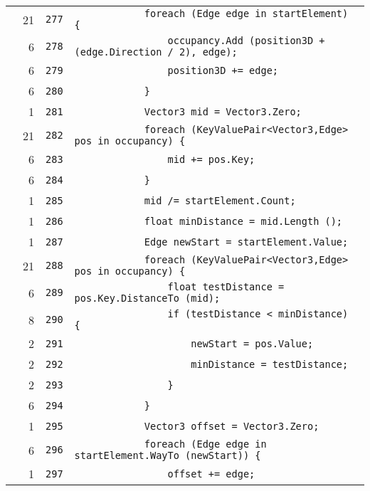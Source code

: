 \documentclass[a4paper,10pt]{article}
\begin{document}
\begin{longtable}[l]{lrrl}
\cellcolor{green} & 21 & \verb~277~ & \verb~            foreach (Edge edge in startElement) {~\\
\cellcolor{green} & 6 & \verb~278~ & \verb~                occupancy.Add (position3D + (edge.Direction / 2), edge);~\\
\cellcolor{green} & 6 & \verb~279~ & \verb~                position3D += edge;~\\
\cellcolor{green} & 6 & \verb~280~ & \verb~            }~\\
\cellcolor{green} & 1 & \verb~281~ & \verb~            Vector3 mid = Vector3.Zero;~\\
\cellcolor{green} & 21 & \verb~282~ & \verb~            foreach (KeyValuePair<Vector3,Edge> pos in occupancy) {~\\
\cellcolor{green} & 6 & \verb~283~ & \verb~                mid += pos.Key;~\\
\cellcolor{green} & 6 & \verb~284~ & \verb~            }~\\
\cellcolor{green} & 1 & \verb~285~ & \verb~            mid /= startElement.Count;~\\
\cellcolor{green} & 1 & \verb~286~ & \verb~            float minDistance = mid.Length ();~\\
\cellcolor{green} & 1 & \verb~287~ & \verb~            Edge newStart = startElement.Value;~\\
\cellcolor{green} & 21 & \verb~288~ & \verb~            foreach (KeyValuePair<Vector3,Edge> pos in occupancy) {~\\
\cellcolor{green} & 6 & \verb~289~ & \verb~                float testDistance = pos.Key.DistanceTo (mid);~\\
\cellcolor{green} & 8 & \verb~290~ & \verb~                if (testDistance < minDistance) {~\\
\cellcolor{green} & 2 & \verb~291~ & \verb~                    newStart = pos.Value;~\\
\cellcolor{green} & 2 & \verb~292~ & \verb~                    minDistance = testDistance;~\\
\cellcolor{green} & 2 & \verb~293~ & \verb~                }~\\
\cellcolor{green} & 6 & \verb~294~ & \verb~            }~\\
\cellcolor{green} & 1 & \verb~295~ & \verb~            Vector3 offset = Vector3.Zero;~\\
\cellcolor{green} & 6 & \verb~296~ & \verb~            foreach (Edge edge in startElement.WayTo (newStart)) {~\\
\cellcolor{green} & 1 & \verb~297~ & \verb~                offset += edge;~\\

\end{longtable}
\end{document}
